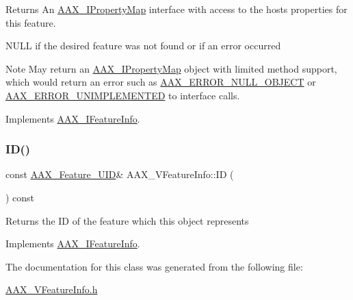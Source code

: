 \begin{DoxyReturn}{Returns}
An \mbox{\hyperlink{a01869}{A\+A\+X\+\_\+\+I\+Property\+Map}} interface with access to the host\textquotesingle{}s properties for this feature. 

{\ttfamily N\+U\+LL} if the desired feature was not found or if an error occurred
\end{DoxyReturn}
\begin{DoxyNote}{Note}
May return an \mbox{\hyperlink{a01869}{A\+A\+X\+\_\+\+I\+Property\+Map}} object with limited method support, which would return an error such as \mbox{\hyperlink{a00494_a5f8c7439f3a706c4f8315a9609811937a647cce13fa531e3a46c6eab694048a9c}{A\+A\+X\+\_\+\+E\+R\+R\+O\+R\+\_\+\+N\+U\+L\+L\+\_\+\+O\+B\+J\+E\+CT}} or \mbox{\hyperlink{a00494_a5f8c7439f3a706c4f8315a9609811937a3b76994b32b97fcd56b19ef8032245df}{A\+A\+X\+\_\+\+E\+R\+R\+O\+R\+\_\+\+U\+N\+I\+M\+P\+L\+E\+M\+E\+N\+T\+ED}} to interface calls. 
\end{DoxyNote}


Implements \mbox{\hyperlink{a01829_ab74a4576cd4e87baa01d046dfa0c752e}{A\+A\+X\+\_\+\+I\+Feature\+Info}}.

\mbox{\label{a01917_ae561b74fa6ff031140d67a4f26030669}} 
\subsubsection{\texorpdfstring{ID()}{ID()}}
{\footnotesize\ttfamily const \mbox{\hyperlink{a00392_a53d6cf8a08224b3e813333e411ce798e}{A\+A\+X\+\_\+\+Feature\+\_\+\+U\+ID}}\& A\+A\+X\+\_\+\+V\+Feature\+Info\+::\+ID (\begin{DoxyParamCaption}{ }\end{DoxyParamCaption}) const\hspace{0.3cm}{\ttfamily [virtual]}}





Returns the ID of the feature which this object represents 

Implements \mbox{\hyperlink{a01829_aec2b87eadca9e5d55d7b93163b5ee1da}{A\+A\+X\+\_\+\+I\+Feature\+Info}}.



The documentation for this class was generated from the following file\+:\begin{DoxyCompactItemize}
\item 
\mbox{\hyperlink{a00710}{A\+A\+X\+\_\+\+V\+Feature\+Info.\+h}}\end{DoxyCompactItemize}
